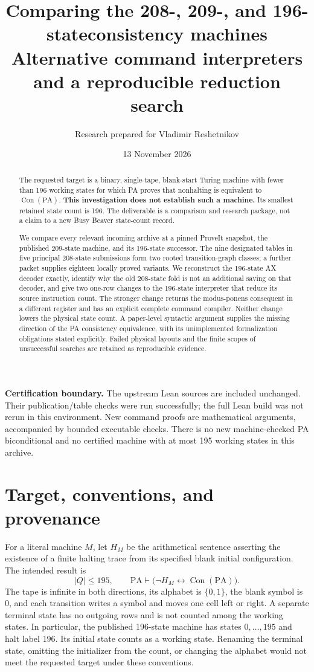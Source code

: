 \documentclass[11pt,a4paper]{article}
\title{\textbf{Comparing the 208-, 209-, and 196-state\break consistency machines}\\[7pt]
\large Alternative command interpreters and a reproducible reduction search}
\author{Research prepared for Vladimir Reshetnikov}
\date{13 November 2026}
\newcommand{\PA}{\mathrm{PA}}
\newcommand{\Con}{\operatorname{Con}}
\begin{document}
\maketitle
\begin{abstract}
The requested target is a binary, single-tape, blank-start Turing machine
with fewer than 196 working states for which PA proves that nonhalting is
equivalent to $\Con(\PA)$. \textbf{This investigation does not establish
such a machine.} Its smallest retained state count is 196. The deliverable
is a comparison and research package, not a claim to a new Busy Beaver
state-count record.

We compare every relevant incoming archive at a pinned ProveIt snapshot,
the published 209-state machine, and its 196-state successor. The nine
designated tables in five principal 208-state submissions form two rooted
transition-graph classes; a further packet supplies eighteen locally
proved variants. We reconstruct the 196-state AX decoder exactly,
identify why the old 208-state fold is not an additional saving on that
decoder, and give two one-row changes to the 196-state interpreter that
reduce its source instruction count. The stronger change returns the
modus-ponens consequent in a different register and has an explicit
complete command compiler. Neither change lowers the physical state
count. A paper-level syntactic argument supplies the missing direction
of the PA consistency equivalence, with its unimplemented formalization
obligations stated explicitly. Failed physical layouts and the finite
scopes of unsuccessful searches are retained as reproducible evidence.
\end{abstract}

\vfill
\noindent\textbf{Certification boundary.} The upstream Lean sources are
included unchanged. Their publication/table checks were run successfully;
the full Lean build was not rerun in this environment. New command proofs
are mathematical arguments, accompanied by bounded executable checks.
There is no new machine-checked PA biconditional and no certified machine
with at most 195 working states in this archive.
\newpage
\begingroup
\small
\setlength{\parskip}{0pt}
\tableofcontents
\endgroup
\newpage

\section{Target, conventions, and provenance}

For a literal machine $M$, let $H_M$ be the arithmetical sentence asserting
the existence of a finite halting trace from its specified blank initial
configuration. The intended result is
\[
 |Q|\le195,\qquad
 \PA\vdash\bigl(\neg H_M\leftrightarrow\Con(\PA)\bigr).
\]
The tape is infinite in both directions, its alphabet is $\{0,1\}$,
the blank symbol is $0$, and each transition writes a symbol and moves
one cell left or right. A separate terminal state has no outgoing rows
and is not counted among the working states. In particular, the published
196-state machine has states $0,\ldots,195$ and halt label $196$.
Its initial state counts as a working state. Renaming the terminal state,
omitting the initializer from the count, or changing the alphabet would
not meet the requested target under these conventions.
\end{document}
